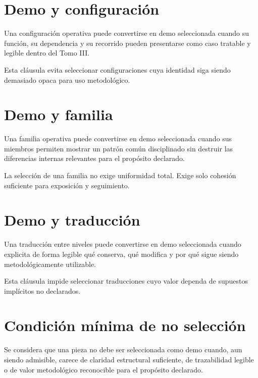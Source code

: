 \section{Demo y configuración}
\begin{definition}
Una configuración operativa puede convertirse en demo seleccionada cuando su función, su dependencia y su recorrido pueden presentarse como caso tratable y legible dentro del Tomo III.
\end{definition}

\begin{observation}
Esta cláusula evita seleccionar configuraciones cuya identidad siga siendo demasiado opaca para uso metodológico.
\end{observation}

\section{Demo y familia}
\begin{definition}
Una familia operativa puede convertirse en demo seleccionada cuando sus miembros permiten mostrar un patrón común disciplinado sin destruir las diferencias internas relevantes para el propósito declarado.
\end{definition}

\begin{observation}
La selección de una familia no exige uniformidad total. Exige solo cohesión suficiente para exposición y seguimiento.
\end{observation}

\section{Demo y traducción}
\begin{definition}
Una traducción entre niveles puede convertirse en demo seleccionada cuando explicita de forma legible qué conserva, qué modifica y por qué sigue siendo metodológicamente utilizable.
\end{definition}

\begin{observation}
Esta cláusula impide seleccionar traducciones cuyo valor dependa de supuestos implícitos no declarados.
\end{observation}

\section{Condición mínima de no selección}
\begin{definition}
Se considera que una pieza no debe ser seleccionada como demo cuando, aun siendo admisible, carece de claridad estructural suficiente, de trazabilidad legible o de valor metodológico reconocible para el propósito declarado.
\end{definition}

